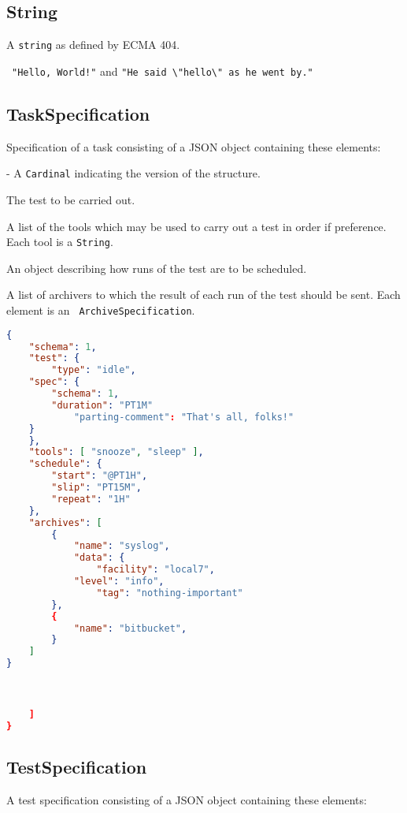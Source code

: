 \documentclass[10pt]{article}
\begin{document}
\subsection{String}
A {\tt string} as defined by ECMA 404.

\example\ {\tt "Hello, World!"} and {\tt "He said
  \textbackslash"hello\textbackslash" as he went by."}



\subsection{TaskSpecification}
Specification of a task consisting of a JSON object containing these
elements:

 - A {\tt Cardinal} indicating the version
of the structure.

 The test to be carried out.

 A list of the tools which may be used to
carry out a test in order if preference.  Each tool is a {\tt String}.

 An object describing how
runs of the test are to be scheduled.

 A list of archivers to which the result of
each run of the test should be sent.  Each element is an {\tt
  ArchiveSpecification}.

\example
\begin{lstlisting}[language=json]
{
    "schema": 1,
    "test": {
        "type": "idle",
	"spec": {
	    "schema": 1,
	    "duration": "PT1M"
            "parting-comment": "That's all, folks!"
	}
    },
    "tools": [ "snooze", "sleep" ],
    "schedule": {
        "start": "@PT1H",
        "slip": "PT15M",
        "repeat": "1H"
    },
    "archives": [
        {
            "name": "syslog",
            "data": {
                "facility": "local7",
        	"level": "info",
                "tag": "nothing-important"
        },
        {
            "name": "bitbucket",
        }
    ]
}



    ]
}
\end{lstlisting}




\subsection{TestSpecification}
A test specification consisting of a JSON object containing these
elements:
\end{document}
